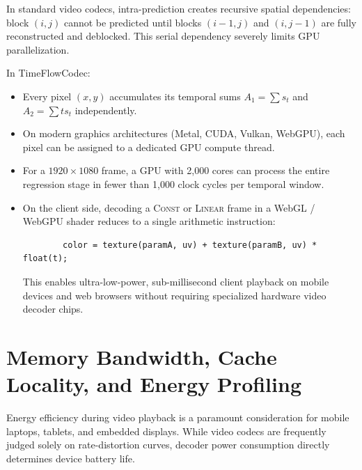 In standard video codecs, intra-prediction creates recursive spatial dependencies: block $(i, j)$ cannot be predicted until blocks $(i-1, j)$ and $(i, j-1)$ are fully reconstructed and deblocked. This serial dependency severely limits GPU parallelization.

In TimeFlowCodec:
\begin{itemize}
    \item Every pixel $(x, y)$ accumulates its temporal sums $A_1 = \sum s_t$ and $A_2 = \sum t s_t$ independently.
    \item On modern graphics architectures (Metal, CUDA, Vulkan, WebGPU), each pixel can be assigned to a dedicated GPU compute thread.
    \item For a $1920 \times 1080$ frame, a GPU with 2,000 cores can process the entire regression stage in fewer than 1,000 clock cycles per temporal window.
    \item On the client side, decoding a \textsc{Const} or \textsc{Linear} frame in a WebGL / WebGPU shader reduces to a single arithmetic instruction:
    \begin{verbatim}
        color = texture(paramA, uv) + texture(paramB, uv) * float(t);
    \end{verbatim}
    This enables ultra-low-power, sub-millisecond client playback on mobile devices and web browsers without requiring specialized hardware video decoder chips.
\end{itemize}

\section{Memory Bandwidth, Cache Locality, and Energy Profiling}
Energy efficiency during video playback is a paramount consideration for mobile laptops, tablets, and embedded displays. While video codecs are frequently judged solely on rate-distortion curves, decoder power consumption directly determines device battery life.

